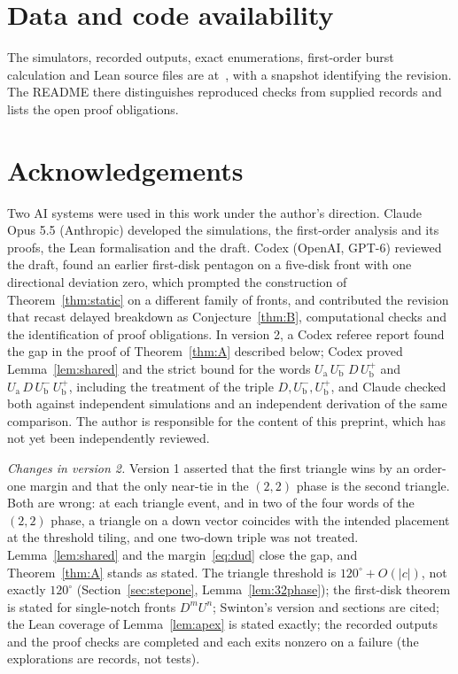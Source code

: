 \documentclass[11pt]{amsart}
\theoremstyle{definition}
\newcommand{\Ua}{U_{\mathrm a}}
\newcommand{\Ub}{U_{\mathrm b}}
\newcommand{\up}[1]{#1^{+}}
\newcommand{\dn}[1]{#1^{-}}
\begin{document}
\section*{Data and code availability}
The simulators, recorded outputs, exact enumerations, first-order burst calculation and Lean source
files are at~\cite{repo}, with a snapshot identifying the revision. The README there distinguishes
reproduced checks from supplied records and lists the open proof obligations.

\section*{Acknowledgements}
Two AI systems were used in this work under the author's direction. Claude Opus 5.5 (Anthropic)
developed the simulations, the first-order analysis and its proofs, the Lean formalisation and the
draft. Codex (OpenAI, GPT-6) reviewed the draft, found an earlier first-disk pentagon on a
five-disk front with one directional deviation zero, which prompted the construction of
Theorem~\ref{thm:static} on a different family of fronts, and contributed the revision that
recast delayed breakdown as Conjecture~\ref{thm:B}, computational checks and the identification of
proof obligations. In version 2, a Codex referee report found the gap in the proof of
Theorem~\ref{thm:A} described below; Codex proved Lemma~\ref{lem:shared} and the strict bound for the words
$\Ua\,\dn{\Ub}\,D\,\up{\Ub}$ and $\Ua\,D\,\dn{\Ub}\,\up{\Ub}$, including the treatment of the triple
$D,\dn{\Ub},\up{\Ub}$, and Claude checked both against independent simulations and an independent
derivation of the same comparison. The author is responsible for the content of this preprint, which has not yet
been independently reviewed.

\emph{Changes in version 2.} Version 1 asserted that the first triangle wins by an order-one margin and
that the only near-tie in the $(2,2)$ phase is the second triangle. Both are wrong: at each triangle
event, and in two of the four words of the $(2,2)$ phase, a triangle on a down vector coincides with the
intended placement at the threshold tiling, and one two-down triple was not treated. Lemma~\ref{lem:shared}
and the margin~\eqref{eq:dud} close the gap, and Theorem~\ref{thm:A} stands as stated. The triangle
threshold is $120^\circ+O(|c|)$, not exactly $120^\circ$ (Section~\ref{sec:stepone}, Lemma~\ref{lem:32phase});
the first-disk theorem is stated for single-notch fronts $D^mU^n$; Swinton's version and sections are
cited; the Lean coverage of Lemma~\ref{lem:apex} is stated exactly; the recorded outputs and the
proof checks are completed and each exits nonzero on a failure (the explorations are records, not tests).
\end{document}
